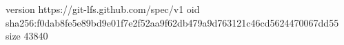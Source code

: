 version https://git-lfs.github.com/spec/v1
oid sha256:f0dab8fe5e89bd9e01f7e2f52aa9f62db479a9d763121c46cd5624470067dd55
size 43840
